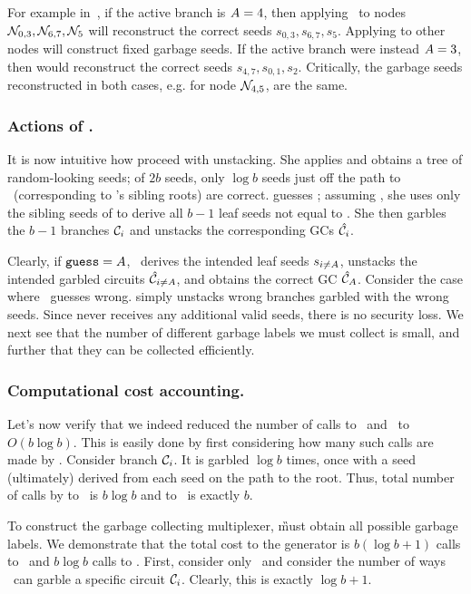 For example in~, if the active branch is $A=4$,
then applying \gadget\ to nodes $\mathtt{\cal N}_{0,3}, \mathtt{\cal N}_{6,7},
\mathtt{\cal N}_{5}$ will reconstruct the correct seeds $s_{0,3}, s_{6,7}, s_{5}$.  Applying \gadget to other nodes
will construct fixed garbage seeds.
If the active branch were instead $A=3$, then \gadget
would reconstruct the correct seeds $s_{4,7}, s_{0,1}, s_{2}$.
Critically, the
garbage seeds reconstructed
in both cases, e.g. for node $\mathtt{\cal N}_{4,5}$, are the same.


\subsubsection{Actions of \E.}

It is now intuitive how \E proceed with unstacking. 
She applies \gadget and obtains a tree of random-looking seeds; of $2b$
seeds, only $\log b$ seeds just off the path to \aid\ (corresponding
to \aid's sibling roots) are correct.  \E guesses \guess; assuming
\guess, she uses only the sibling seeds of \guess to derive all
$b-1$ leaf seeds not equal to \guess.  She then garbles the $b-1$
branches $\mathcal C_i$ and unstacks the corresponding GCs $\hat{\mathcal C}_i$.

Clearly, if $\mathtt{guess}=A$, \E\ derives the intended leaf seeds
$s_{i\neq A}$, unstacks the intended garbled circuits
$\hat{\mathcal C}_{i\neq A}$, and obtains the correct GC $\hat{\mathcal C}_{A}$.
%
Consider the case where \E\ guesses wrong. %
\E simply unstacks wrong branches garbled with the wrong seeds.
Since \E never receives any additional valid seeds,
there is no security loss.  We next see that the number of different
garbage labels we must collect is small, and further that they can be
collected efficiently.

\subsubsection{Computational cost accounting.} Let's now verify that
we indeed reduced the number of calls to \Gb\ and \Ev\ to $O(b \log
b)$.  This is easily done by first considering how many such calls are
made by \E.  Consider branch $\mathcal C_i$.  It is garbled $\log b$ times,
once with a seed (ultimately) derived from each seed on the path to
the root.  Thus, total number of calls by \E to \Gb\ is $b \log b$ and
to \Ev\ is exactly $b$.  

To construct the garbage collecting multiplexer, \G must obtain all possible garbage labels.  We
demonstrate that the total cost to the generator is $b (\log b +
1)$ calls to \Gb\ and $b \log b$ calls to \Ev.
First, consider only \Gb\ and consider the number of ways \E\ can garble a specific circuit $\mathcal C_i$. Clearly, this is exactly $\log b+1$.

